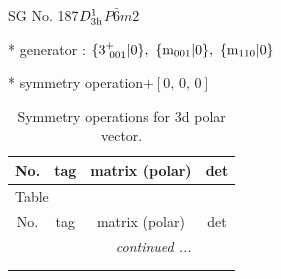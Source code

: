 \documentclass[fleqn,8pt]{jsarticle}
\begin{document}
\setcounter{MaxMatrixCols}{32}

\renewcommand{\tablename}{Table~}
\renewcommand{\figurename}{Figure~}
\begin{center}
\LARGE
SG No. 187\quad$D_{\rm 3h}^{1}$\quad$P\bar{6}m2$\quad[ hexagonal ]
\end{center}

* generator : $\{3^{+}_{\,\,001}|0\},\,\,\{{\rm m}_{001}|0\},\,\,\{{\rm m}_{110}|0\}$

* symmetry operation\quad$+\left[ 0,\, 0,\, 0 \right]$
\renewcommand{\arraystretch}{1.3}
\begin{longtable}{cccc}
\caption{Symmetry operations for 3d polar vector.}
 \\
 \hline \hline
No. & tag & matrix (polar) & det \\ \hline \endfirsthead

\multicolumn{3}{l}{\tablename\ \thetable{}} \\
 \hline \hline
No. & tag & matrix (polar) & det \\ \hline \endhead

 \hline \hline
\multicolumn{3}{r}{\footnotesize\it continued ...} \\ \endfoot

 \hline \hline
\multicolumn{3}{r}{} \\ \endlastfoot


\end{longtable}
\end{document}
